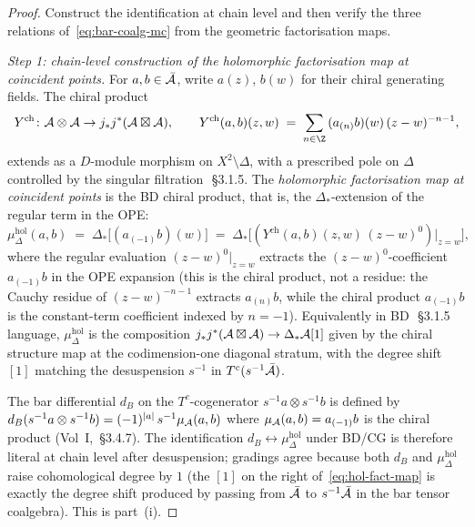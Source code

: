 \begin{proof}
Construct the identification at chain level and then verify the
three relations of~\eqref{eq:bar-coalg-mc} from the geometric
factorisation maps.

\emph{Step 1: chain-level construction of the holomorphic
factorisation map at coincident points.}
For $a,b\in\bar{\mathcal{A}}$, write $a(z)$, $b(w)$ for their chiral
generating fields. The chiral product
\begin{equation}\label{eq:chiral-prod-OPE}
 Y^{\mathrm{ch}}\colon \cA\otimes\cA\to
 j_*j^*(\cA\boxtimes\cA),\qquad
 Y^{\mathrm{ch}}(a,b)(z,w) \;=\; \sum_{n\in\Z}\,(a_{(n)}b)(w)\,
 (z-w)^{-n-1},
\end{equation}
extends as a $D$-module morphism on $X^2\setminus\Delta$, with a
prescribed pole on $\Delta$ controlled by the singular
filtration~\cite{BD04}\,\S3.1.5. The \emph{holomorphic factorisation
map at coincident points} is the BD chiral product, that is, the
$\Delta_*$-extension of the regular term in the OPE:
\begin{equation}\label{eq:hol-fact-residue}
 \mu^{\mathrm{hol}}_\Delta(a,b)
 \;=\;
 \Delta_*\bigl[(a_{(-1)}b)(w)\bigr]
 \;=\;
 \Delta_*\bigl[(Y^{\mathrm{ch}}(a,b)(z,w)\,(z-w)^{0})|_{z=w}\bigr],
\end{equation}
where the regular evaluation $(z-w)^{0}|_{z=w}$ extracts the
$(z-w)^{0}$-coefficient $a_{(-1)}b$ in the OPE expansion (this is
the chiral product, not a residue: the Cauchy residue of
$(z-w)^{-n-1}$ extracts $a_{(n)}b$, while the chiral product
$a_{(-1)}b$ is the
constant-term coefficient indexed by $n=-1$). Equivalently in
BD~\cite{BD04}\,\S3.1.5 language, $\mu^{\mathrm{hol}}_\Delta$ is the
composition $j_*j^*(\mathcal{A}\boxtimes\mathcal{A})\to\Delta_*\mathcal{A}[1]$ given by the
chiral structure map at the codimension-one diagonal stratum, with
the degree shift $[1]$ matching the desuspension $s^{-1}$ in
$T^c(s^{-1}\bar{\mathcal{A}})$.

The bar differential $d_B$ on the $T^c$-cogenerator
$s^{-1}a\otimes s^{-1}b$ is defined by
$d_B(s^{-1}a\otimes s^{-1}b)=(-1)^{|a|}\,s^{-1}\mu_{\mathcal{A}}(a,b)$
where $\mu_{\mathcal{A}}(a,b)=a_{(-1)}b$ is the chiral product
(Vol~I, \cite{BD04}\,\S3.4.7). The identification
$d_B\leftrightarrow\mu^{\mathrm{hol}}_\Delta$ under BD/CG is therefore
literal at chain level after desuspension; gradings agree because
both $d_B$ and $\mu^{\mathrm{hol}}_\Delta$ raise cohomological degree
by $1$ (the $[1]$ on the right of~\eqref{eq:hol-fact-map} is exactly
the degree shift produced by passing from $\bar{\mathcal{A}}$ to $s^{-1}\bar{\mathcal{A}}$
in the bar tensor coalgebra). This is part~(i).


\end{proof}
